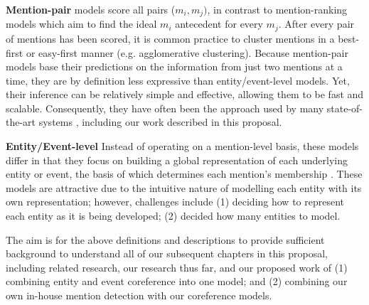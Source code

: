 \textbf{Mention-pair} models score all pairs ($m_i,m_j)$, in contrast to mention-ranking models which aim to find the ideal $m_i$ antecedent for every $m_j$.  After every pair of mentions has been scored, it is common practice to cluster mentions in a best-first or easy-first manner (e.g. agglomerative clustering).  Because mention-pair models base their predictions on the information from just two mentions at a time, they are by definition less expressive than entity/event-level models.  Yet, their inference can be relatively simple and effective, allowing them to be fast and scalable.  Consequently, they have often been the approach used by many state-of-the-art systems \cite{Soon:2001:MLA:972597.972602, DBLP:conf/emnlp/DurrettK13}, including our work described in this proposal.

\textbf{Entity/Event-level} Instead of operating on a mention-level basis, these models differ in that they focus on building a global representation of each underlying entity or event, the basis of which determines each mention's membership \cite{DBLP:conf/naacl/WisemanRS16, clark2016improving}.  These models are attractive due to the intuitive nature of modelling each entity with its own representation; however, challenges include (1) deciding how to represent each entity as it is being developed; (2) decided how many entities to model.

The aim is for the above definitions and descriptions to provide sufficient background to understand all of our subsequent chapters in this proposal, including related research, our research thus far, and our proposed work of (1) combining entity and event coreference into one model; and (2) combining our own in-house mention detection with our coreference models.
